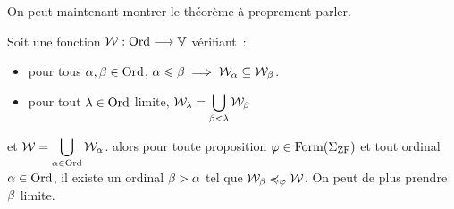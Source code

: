 \noindent
On peut maintenant montrer le théorème à proprement parler.

\begin{theorem}[Réflexion]\label{thm.reflexion}
  Soit une fonction $\mathcal{W} : \displaystyle \operatorname{Ord} \longrightarrow \mathbb V$ vérifiant~:
  \begin{itemize}
  \item pour tous $\alpha, \beta \in \operatorname{Ord}$,
    $\alpha \leqslant \beta \implies \mathcal{W}_\alpha \subseteq \mathcal{W}_\beta$.
  \item pour tout $\lambda \in \operatorname{Ord}$ limite,
    $\displaystyle \mathcal{W}_\lambda = \bigcup_{\beta < \lambda} \mathcal{W}_\beta$
  \end{itemize}
  et $\displaystyle \mathcal{W} = \bigcup_{\alpha \in \operatorname{Ord}} \mathcal{W}_\alpha$.
  alors pour toute proposition $\varphi\in\operatorname{Form}(\Sigma_{\operatorname{ZF}})$ et tout
  ordinal $\alpha \in \operatorname{Ord}$, il existe un ordinal $\beta > \alpha$ tel que
  $\mathcal{W}_\beta\preccurlyeq_{\varphi} \mathcal{W}$. On peut de plus prendre $\beta$ limite.
\end{theorem}

